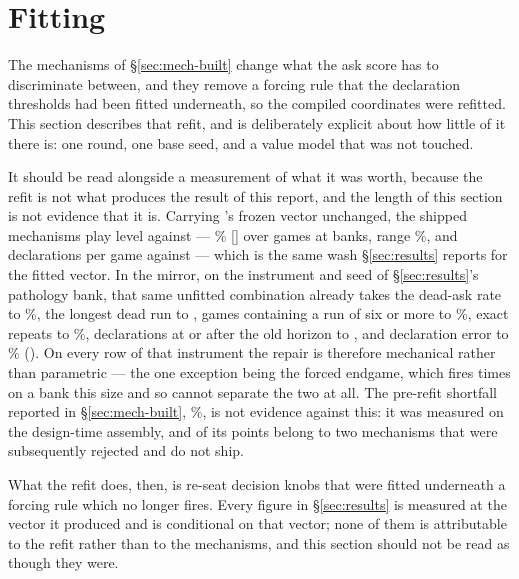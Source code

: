 \section{Fitting}
\label{sec:fitting}

The mechanisms of \S\ref{sec:mech-built} change what the ask score has to
discriminate between, and they remove a forcing rule that the declaration
thresholds had been fitted underneath, so the compiled coordinates were
refitted. This section describes that refit, and is deliberately explicit about
how little of it there is: one round, one base seed, and a value model that was
not touched.

It should be read alongside a measurement of what it was worth, because the
refit is not what produces the result of this report, and the length of this
section is not evidence that it is. Carrying \vfour{}'s frozen
vector unchanged, the shipped mechanisms play level against \vfour{} ---
\numShipParamWin\% [\numShipParamCI] over \numShipParamGames{} games at
\numShipParamSeeds{} banks, range \numShipParamRange\%, and
\numShipParamDecl{} declarations per game against \numShipParamVfourDecl{} ---
which is the same wash \S\ref{sec:results} reports for the fitted vector. In the
mirror, on the instrument and seed of \S\ref{sec:results}'s pathology bank, that
same unfitted combination already takes the dead-ask rate to
\numShipParamDeadAsk\%, the longest dead run to \numShipParamDeadRun{}, games
containing a run of six or more to \numShipParamDeadRunGames\%, exact repeats
to \numShipParamRepeat\%, declarations at or after the old horizon to
\numShipParamPostHorizon{}, and declaration error to
\numShipParamDeclWrong\% ().
On every row of that instrument the repair is therefore mechanical rather than
parametric --- the one exception being the forced endgame, which fires
\numShipParamForcedN{} times on a bank this size and so cannot separate the two
at all. The pre-refit shortfall reported in \S\ref{sec:mech-built},
\numVfourParamWin\%, is not evidence against this: it was measured on the
design-time assembly, and \numRejectedCost{} of its points belong to two
mechanisms that were subsequently rejected and do not ship.

What the refit does, then, is re-seat \numFitKnobs{} decision knobs that were
fitted underneath a forcing rule which no longer fires. Every figure in
\S\ref{sec:results} is measured at the vector it produced and is conditional on
that vector; none of them is attributable to the refit rather than to the
mechanisms, and this section should not be read as though they were.

